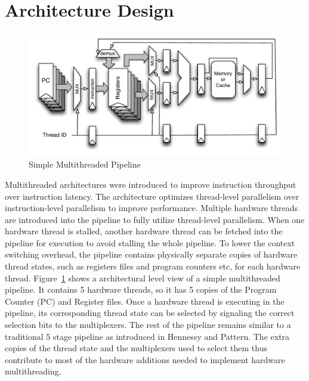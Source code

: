 \section{Architecture Design}
\begin{figure}
\begin{center}
\includegraphics[scale=.8]{figs/multithreaded_pipeline_block}
\end{center}
\vspace{-30pt}
\caption{Simple Multithreaded Pipeline}
\label{fig:multi-thread pipeline simplified}
\end{figure}
Multithreaded architectures were introduced to improve instruction throughput over instruction latency.
The architecture optimizes thread-level parallelism over instruction-level parallelism to improve performance.
Multiple hardware threads are introduced into the pipeline to fully utilize thread-level parallelism. 
When one hardware thread is stalled, another hardware thread can be fetched into the pipeline for execution to avoid stalling the whole pipeline. 
To lower the context switching overhead, the pipeline contains physically separate copies of hardware thread states, such as registers files and program counters etc, for each hardware thread.
Figure~\ref{fig:multi-thread pipeline simplified} shows a architectural level view of a simple multithreaded pipeline.
It contains 5 hardware threads, so it has 5 copies of the Program Counter (PC) and Register files.
Once a hardware thread is executing in the pipeline, its corresponding thread state can be selected by signaling the correct selection bits to the multiplexers.
The rest of the pipeline remains similar to a traditional 5 stage pipeline as introduced in Hennessy and Pattern.   
The extra copies of the thread state and the multiplexers used to select them thus contribute to most of the hardware additions needed to implement hardware multithreading.

